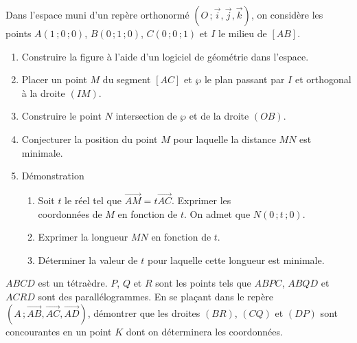 \documentclass{cornouaille}
\begin{document}
  \begin{exercice}
    Dans l'espace muni d'un repère orthonormé
    $(O\,;\vec{i},\vec{j},\vec{k})$, on considère les points
    $A(1\,;0\,;0)$, $B(0\,;1\,;0)$, $C(0\,;0\,;1)$ et $I$ le milieu de
    $[AB]$.
    \begin{enumerate}
    \item Construire la figure à l'aide d'un logiciel de géométrie dans
      l'espace.
    \item Placer un point $M$ du segment $[AC]$ et $\wp$ le plan passant
      par $I$ et orthogonal à la droite $(IM)$.
    \item Construire le point $N$ intersection de $\wp$ et de la droite
      $(OB)$.
    \item Conjecturer la position du point $M$ pour laquelle la distance
      $MN$ est minimale.
    \item Démonstration
      \begin{enumerate}
      \item Soit $t$ le réel tel que
        $\overrightarrow{AM}=t\overrightarrow{AC}$. Exprimer les\\
        coordonnées de $M$ en fonction de $t$. On admet que $N(0\,;t\,;0)$.
      \item Exprimer la longueur $MN$ en fonction de $t$.
      \item Déterminer la valeur de $t$ pour laquelle cette longueur est
        minimale.
      \end{enumerate}
    \end{enumerate}
  \end{exercice}

  \begin{exercice}
    $ABCD$ est un tétraèdre. $P$, $Q$ et $R$ sont les points tels que
    $ABPC$, $ABQD$ et $ACRD$ sont des parallélogrammes.  En se plaçant
    dans le repère
    $(A\,;\overrightarrow{AB},\overrightarrow{AC},\overrightarrow{AD})$,
    démontrer que les droites $(BR)$, $(CQ)$ et $(DP)$ sont
    concourantes en un point $K$ dont on déterminera les coordonnées.
  \end{exercice}
\end{document}
